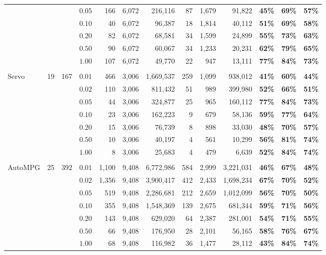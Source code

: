 \documentclass[ijoc,noblindrev]{informs3} %
\begin{document}
\begin{table}
\begin{center}
\begin{tabular}{l r r r|r r r | r r r  | r r r }
		&&&$0.05$&166&6,072&216,116&87&1,679&91,822&\textbf{45\%}&\textbf{69\%}&\textbf{57\%}\\
		&&&$0.10$&40&6,072&96,387&18&1,814&40,112&\textbf{51\%}&\textbf{69\%}&\textbf{58\%}\\
		&&&$0.20$&82&6,072&68,581&34&1,599&24,899&\textbf{55\%}&\textbf{73\%}&\textbf{63\%}\\
		&&&$0.50$&90&6,072&60,067&34&1,233&20,231&\textbf{62\%}&\textbf{79\%}&\textbf{65\%}\\
		&&&$1.00$&107&6,072&49,770&22&947&13,111&\textbf{77\%}&\textbf{84\%}&\textbf{73\%}\\
		&&&&&&&&&&&&\\
		\multirow{7}{*}{Servo}&\multirow{7}{*}{19}&\multirow{7}{*}{167}&
		$0.01$&466&3,006&1,669,537&259&1,099&938,012&\textbf{41\%}&\textbf{60\%}&\textbf{44\%}\\
		&&&$0.02$&110&3,006&811,432&51&989&399,980&\textbf{52\%}&\textbf{66\%}&\textbf{51\%}\\
		&&&$0.05$&44&3,006&324,877&25&965&160,112&\textbf{77\%}&\textbf{84\%}&\textbf{73\%}\\
		&&&$0.10$&23&3,006&162,223&9&679&58,136&\textbf{59\%}&\textbf{77\%}&\textbf{64\%}\\
		&&&$0.20$&15&3,006&76,739&8&898&33,030&\textbf{48\%}&\textbf{70\%}&\textbf{57\%}\\
		&&&$0.50$&10&3,006&40,197&4&561&10,299&\textbf{56\%}&\textbf{81\%}&\textbf{74\%}\\
		&&&$1.00$&8&3,006&25,683&4&479&6,639&\textbf{52\%}&\textbf{84\%}&\textbf{74\%}\\
			&&&&&&&&&&&&\\
		\multirow{7}{*}{AutoMPG}&\multirow{7}{*}{25}&\multirow{7}{*}{392}&
		$0.01$&1,100&9,408&6,772,986&584&2,999&3,221,031&\textbf{46\%}&\textbf{67\%}&\textbf{48\%}\\
		&&&$0.02$&1,356&9,408&3,900,417&412&2,433&1,698,234&\textbf{67\%}&\textbf{70\%}&\textbf{52\%}\\
		&&&$0.05$&519&9,408&2,286,681&212&2,659&1,012,099&\textbf{56\%}&\textbf{70\%}&\textbf{50\%}\\
		&&&$0.10$&355&9,408&1,548,369&139&2,675&681,344&\textbf{59\%}&\textbf{71\%}&\textbf{56\%}\\
		&&&$0.20$&143&9,408&629,020&64&2,387&281,001&\textbf{54\%}&\textbf{71\%}&\textbf{55\%}\\
		&&&$0.50$&66&9,408&176,950&28&2,101&56,165&\textbf{58\%}&\textbf{76\%}&\textbf{67\%}\\
		&&&$1.00$&68&9,408&116,982&36&1,477&28,112&\textbf{43\%}&\textbf{84\%}&\textbf{74\%}\\
		\hline
	\end{tabular}
    \end{center}
\end{table}
\end{document}

